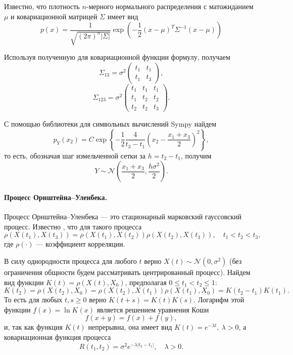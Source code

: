 \documentclass[16pt]{article}
\newcommand\A{(\cdot)}
\begin{document}
Известно, что плотность $n$-мерного нормального распределения с матожиданием $\mu$ и ковариационной матрицей $\Sigma$ имеет вид
\begin{equation}
p(x) = \dfrac{1}{\sqrt{(2\pi)^n|\Sigma|}}\exp\left(-\frac{1}{2} (x - \mu)^T\Sigma^{-1} (x - \mu)\right)
\end{equation}

Используя полученную для ковариационной функции формулу, получаем
$$
\Sigma_{13} = \sigma^2 \begin{pmatrix} 
t_1 & t_1 \\
t_1 & t_3
\end{pmatrix},
$$
$$
\Sigma_{123} = \sigma^2 \begin{pmatrix}
t_1 & t_1 & t_1 \\
t_1 & t_2 & t_2 \\
t_2 & t_2 & t_3
\end{pmatrix}.
$$

С помощью библиотеки для символьных вычислений Sympy найдем
$$p_Y(x_2) = C \exp\left\{ -\dfrac12\dfrac{4}{t_3 - t_1} \left(x_2 - \dfrac{x_1 + x_3}2\right)^2\right\},$$
то есть, обозначая шаг измельченной сетки за $h = t_2 - t_1$, получим $$Y \sim \mathcal{N}\left(\dfrac{x_1 + x_3}{2}, \dfrac{h\sigma^2}{2}\right).$$

\paragraph{Процесс Орнштейна--Уленбека.}

Процесс Орнштейна--Уленбека --- это стационарный марковский гауссовский процесс.
Известно \cite{Feller}, что для такого процесса 
$$\rho(X(t_1), X(t_3)) = \rho(X(t_1), X(t_2))\rho(X(t_2), X(t_3)), \quad t_1 < t_2 < t_3,$$
где $\rho\A$ --- коэффициент корреляции.

В силу однородности процесса для любого $t$ верно $X(t) \sim \mathcal{N}(0, \sigma^2)$ (без ограничения общности будем рассматривать центрированный процесс).
Найдем вид функции $K(t) = \rho(X(t), X_0)$, предполагая $0 \leq t_1 < t_2 \leq 1$:
$$ K(t_2) = \rho(X(t_2), X_0) = \rho(X(t_2), X(t_1))\rho(X(t_1), X_0) = K(t_2 - t_1)K(t_1).$$
То есть для любых $t, s \geq 0$ верно $K(t + s) = K(t)K(s)$. Логарифм этой функции $f(x) = \ln K(x)$ является решением уравнения Коши
$$f(x + y) = f(x) + f(y),$$
и, так как функция $K(t)$ непрерывна, она имеет вид
$K(t) = e^{-\lambda t}, \ \lambda > 0$, а ковариационная функция процесса
$$R(t_1, t_2) = \sigma^2 e^{-\lambda |t_2 - t_1|}, \quad \lambda > 0.$$
\end{document}
